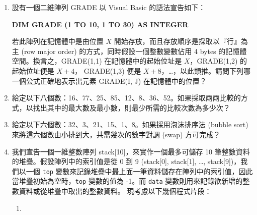 \documentclass[12pt,a4paper]{report}
\begin{document}
\begin{CJK}{UTF8}{bkai}
\begin{enumerate}
\begin{optionlist}
  \end{optionlist}
\item 設有一個二維陣列 GRADE 以 Visual Basic 的語法宣告如下：
\begin{center}
\textbf{DIM GRADE (1 TO 10, 1 TO 30) AS INTEGER}
\end{center}
若此陣列在記憶體中是由位置 $X$ 開始存放，而且存放順序是採取以『行』為主 (row major order) 的方式，同時假設一個整數變數佔用 4 bytes 的記憶體空間。換言之，GRADE(1,1) 在記憶體中的起始位址是 $X$，GRADE(1,2) 的起始位址便是 $X+4$， GRADE(1,3) 便是 $X+8$，…，以此類推。請問下列哪一個公式正確地表示出元素 GRADE(I, J) 在記憶體中的位置？
\item 給定以下八個數：16、77、25、85、12、8、36、52。如果採取兩兩比較的方式，以找出其中的最大數及最小數，則最少所需的比較次數為多少次？
\item 給定以下六個數：32、3、21、15、1、8。如果採用泡沫排序法 (bubble sort) 來將這六個數由小排到大，共需幾次的數字對調 (swap) 方可完成？
\item 我們宣告一個一維整數陣列 stack[10]，來實作一個最多可儲存 10 筆整數資料的堆疊。假設陣列中的索引值是從 0 到 9 (stack[0], stack[1], …, stack[9])，我們以一個 \texttt{top} 變數來記錄堆疊中最上面一筆資料儲存在陣列中的索引值，因此當堆疊初始為空時，\texttt{top} 變數的值為 -1。而 \texttt{data} 變數則用來記錄欲新增的整數資料或從堆疊中取出的整數資料。
現考慮以下幾個程式片段：
  \begin{enumerate}[label=(\Roman*)]
  \item \label{ntpc-94-p31-1}

\end{enumerate}
\end{enumerate}
\end{CJK}
\end{document}
